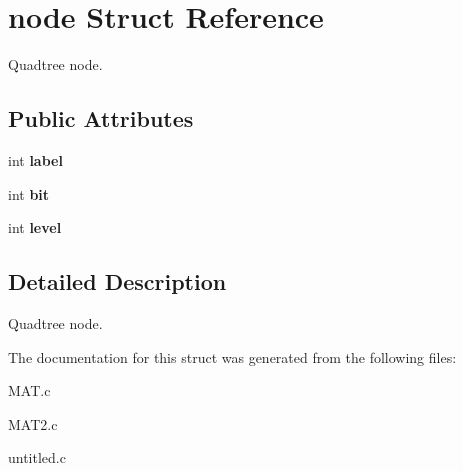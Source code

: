 \hypertarget{structnode}{}\section{node Struct Reference}
\label{structnode}


Quadtree node.  


\subsection*{Public Attributes}
\begin{DoxyCompactItemize}
\item 
\mbox{\label{structnode_a964cbb51357a791bf72d51d353e86be7}} 
int {\bfseries label}
\item 
\mbox{\label{structnode_a4e87cbc8748d74dab3bd9982f96bf11b}} 
int {\bfseries bit}
\item 
\mbox{\label{structnode_a3871d43e823ba9542b052912d01709dd}} 
int {\bfseries level}
\end{DoxyCompactItemize}


\subsection{Detailed Description}
Quadtree node. 

The documentation for this struct was generated from the following files\+:\begin{DoxyCompactItemize}
\item 
M\+A\+T.\+c\item 
M\+A\+T2.\+c\item 
untitled.\+c\end{DoxyCompactItemize}

